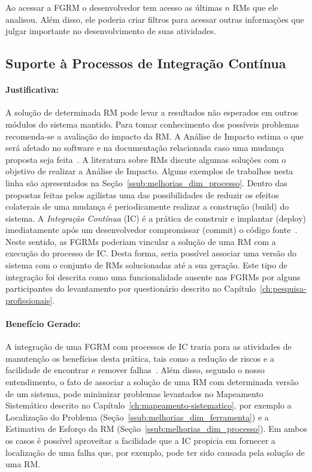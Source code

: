 Ao acessar a FGRM o desenvolvedor tem acesso as últimas $n$ RMs que ele
analisou. Além disso, ele poderia criar filtros para acessar outras informações
que julgar importante no desenvolvimento de suas atividades.

\subsection{Suporte à Processos de Integração Contínua}
\label{sub:suporte_integracao_continua}


\paragraph{Justificativa:}
\label{par:justificativa_s05}

A solução de determinada RM pode levar a resultados não esperados em outros
módulos do sistema mantido. Para tomar conhecimento dos possíveis problemas
recomenda-se a avaliação do impacto da RM\@. A Análise de Impacto estima o que
será afetado no software e na documentação relacionada caso uma mudança proposta
seja feita~\cite{arnold1996software}. A literatura sobre RMs discute algumas
soluções com o objetivo de realizar a Análise de Impacto. Alguns exemplos de
trabalhos nesta linha são apresentados na
Seção~\ref{ssub:melhorias_dim_processo}. Dentro das propostas feitas pelos
agilistas uma das possibilidades de reduzir os efeitos colaterais de uma mudança
é periodicamente realizar a construção (build) do sistema. A \textit{Integração
    Contínua} (IC) é a prática de construir e implantar (deploy) imediatamente
após um desenvolvedor compromissar (commit) o código
fonte~\cite{aiello2010configuration}. Neste sentido, as FGRMs poderiam vincular
a solução de uma RM com a execução do processo de IC\@. Desta forma, seria
possível associar uma versão do sistema com o conjunto de RMs solucionadas até a
sua geração. Este tipo de integração foi descrita como uma funcionalidade
ausente nas FGRMs por alguns participantes do levantamento por questionário
descrito no Capítulo~\ref{ch:pesquisa-profissionais}.

\paragraph{Benefício Gerado:}
\label{par:papéis_afetados_s05}

A integração de uma FGRM com processos de IC traria para as atividades de
manutenção os benefícios desta prática, tais como a redução de riscos e a
facilidade de encontrar e remover falhas~\cite{fowler2006continuous}.  Além
disso, segundo o nosso entendimento, o fato de associar a solução de uma RM com
determinada versão de um sistema, pode minimizar problemas levantados no
Mapeamento Sistemático descrito no Capítulo~\ref{ch:mapeamento-sistematico}, por
exemplo a Localização do Problema (Seção~\ref{ssub:melhorias_dim_ferramenta}) e
a Estimativa de Esforço da RM (Seção~\ref{ssub:melhorias_dim_processo}). Em
ambos os casos é possível aproveitar a facilidade que a IC propicia em fornecer
a localização de uma falha que, por exemplo, pode ter sido causada pela solução
de uma RM\@.

